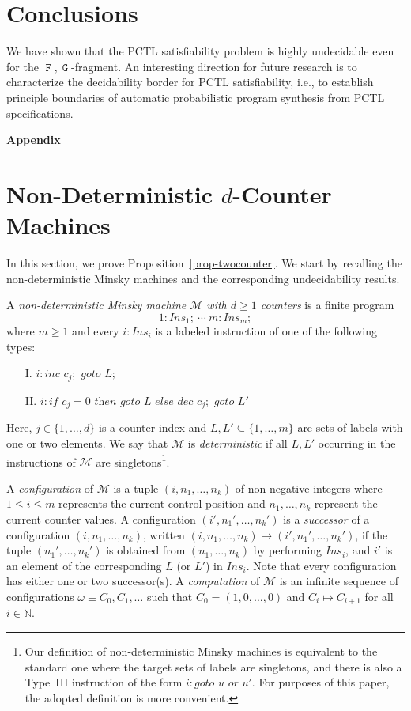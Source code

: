 \documentclass[a4paper,UKenglish,cleveref, autoref, thm-restate]{lipics-v2021}
\newcommand{\N}{\mathbb{N}}
\newcommand{\M}{\mathcal{M}}
\newcommand{\Ins}{\mathit{Ins}}
\newcommand*{\opf}{\operatorname{\pmb{\mathtt{F}}}}
\newcommand*{\opg}{\operatorname{\pmb{\mathtt{G}}}}
\begin{document}
\section{Conclusions}

We have shown that the PCTL satisfiability problem is highly undecidable even for the \mbox{$\opf,\opg$-fragment}. An interesting direction for future research is to characterize the decidability border for PCTL satisfiability, i.e., to establish principle boundaries of automatic probabilistic program synthesis from PCTL specifications.




\clearpage
\appendix

\begin{center}
  \huge\bf Appendix
\end{center}
\section{Non-Deterministic $d$-Counter Machines}
\label{app-Minsky}

In this section, we prove Proposition~\ref{prop-twocounter}. We start by recalling the non-deterministic Minsky machines \cite{Minsky:book} and the corresponding undecidability results.

A \emph{non-deterministic Minsky machine $\M$ with $d \geq 1$ counters} is a finite program
\[
    1: \Ins_1; \ \cdots  \ m: \Ins_m;\]
where $m \geq 1$ and every $i: \Ins_i$ is a labeled instruction of one of the following types:
\begin{itemize}
  \item[I.] $i: \textit{inc } c_j; \textit{ goto } L;$ 
  \item[II.] $i: \textit{if } c_j{=}0 \textit{ then goto } L \textit{ else dec } c_j; \textit{ goto } L'$
\end{itemize}
Here, $j \in \{1,\ldots,d\}$ is a counter index and $L,L' \subseteq \{1,\ldots,m\}$
are sets of labels with one or two elements. We say that $\M$ is \emph{deterministic} if all $L,L'$ occurring in the instructions of $\M$ are singletons\footnote{Our definition of non-deterministic Minsky machines is equivalent to the standard one where the target sets of labels are singletons, and there is also a Type~III instruction of the form $i: \textit{goto } u \textit{ or } u'$. For purposes of this paper, the adopted definition is more convenient.}.

A \emph{configuration} of $\M$ is a tuple $(i,n_1,\ldots,n_k)$ of non-negative integers where $1 \leq i \leq m$ represents the current control position and $n_1,\ldots,n_k$ represent the current counter values. A configuration $(i',n_1',\ldots,n_k')$ is a \emph{successor} of a configuration  $(i,n_1,\ldots,n_k)$, written $(i,n_1,\ldots,n_k) \mapsto (i',n_1',\ldots,n_k')$, if the tuple  $(n_1',\ldots,n_k')$ is obtained from $(n_1,\ldots,n_k)$ by performing $\Ins_i$, and $i'$ is an element of the corresponding $L$ (or $L'$) in $\Ins_i$. Note that every configuration has either one or two successor(s). A \emph{computation} of $\M$ is an infinite sequence of configurations $\omega \equiv C_0,C_1,\ldots$ such that $C_0 = (1,0,\ldots,0)$ and $C_i \mapsto C_{i+1}$ for all $i \in \N$. 
\end{document}
